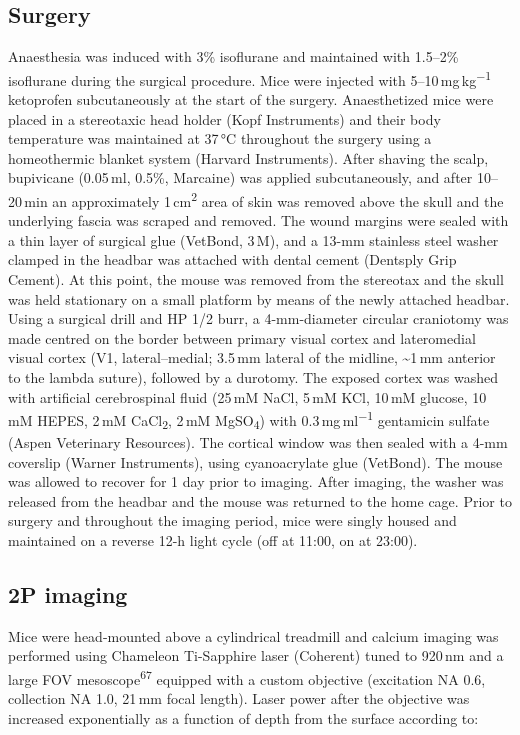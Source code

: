 \documentclass{article}
\begin{document}
\subsection*{Surgery}

Anaesthesia was induced with 3\% isoflurane and maintained with 1.5–2\% isoflurane during the surgical procedure. Mice were injected with 5–10\,mg\,kg\textsuperscript{−1} ketoprofen subcutaneously at the start of the surgery. Anaesthetized mice were placed in a stereotaxic head holder (Kopf Instruments) and their body temperature was maintained at 37\,°C throughout the surgery using a homeothermic blanket system (Harvard Instruments). After shaving the scalp, bupivicane (0.05\,ml, 0.5\%, Marcaine) was applied subcutaneously, and after 10–20\,min an approximately 1\,cm\textsuperscript{2} area of skin was removed above the skull and the underlying fascia was scraped and removed. The wound margins were sealed with a thin layer of surgical glue (VetBond, 3\,M), and a 13-mm stainless steel washer clamped in the headbar was attached with dental cement (Dentsply Grip Cement). At this point, the mouse was removed from the stereotax and the skull was held stationary on a small platform by means of the newly attached headbar. Using a surgical drill and HP 1/2 burr, a 4-mm-diameter circular craniotomy was made centred on the border between primary visual cortex and lateromedial visual cortex (V1, lateral–medial; 3.5\,mm lateral of the midline, \textasciitilde{}1\,mm anterior to the lambda suture), followed by a durotomy. The exposed cortex was washed with artificial cerebrospinal fluid (25\,mM NaCl, 5\,mM KCl, 10\,mM glucose, 10\,mM HEPES, 2\,mM CaCl\textsubscript{2}, 2\,mM MgSO\textsubscript{4}) with 0.3\,mg\,ml\textsuperscript{−1} gentamicin sulfate (Aspen Veterinary Resources). The cortical window was then sealed with a 4-mm coverslip (Warner Instruments), using cyanoacrylate glue (VetBond). The mouse was allowed to recover for 1 day prior to imaging. After imaging, the washer was released from the headbar and the mouse was returned to the home cage. Prior to surgery and throughout the imaging period, mice were singly housed and maintained on a reverse 12-h light cycle (off at 11:00, on at 23:00).

\subsection*{2P imaging}

Mice were head-mounted above a cylindrical treadmill and calcium imaging was performed using Chameleon Ti-Sapphire laser (Coherent) tuned to 920\,nm and a large FOV mesoscope\textsuperscript{67} equipped with a custom objective (excitation NA 0.6, collection NA 1.0, 21\,mm focal length). Laser power after the objective was increased exponentially as a function of depth from the surface according to:
\end{document}
